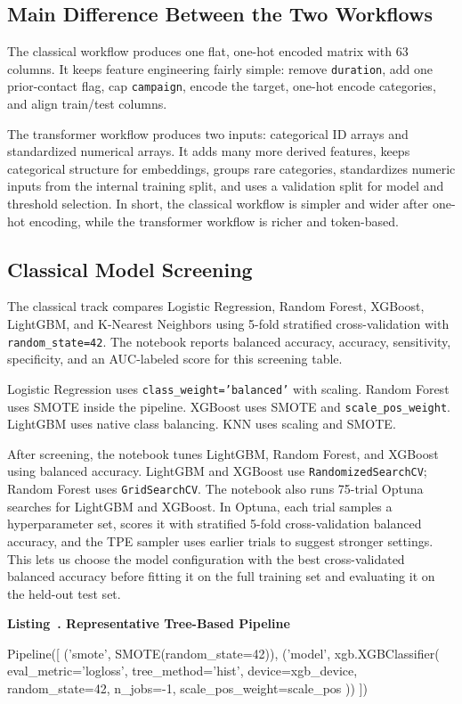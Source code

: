 \documentclass[10pt,twocolumn]{article}
\newcounter{listing}
\renewcommand{\thelisting}{\arabic{listing}}
\newcommand{\listingcaption}[2]{%
  \refstepcounter{listing}%
  \par\smallskip\noindent\textbf{Listing~\thelisting. #1}\label{#2}\par
}
\newcommand{\codestr}[1]{\textcolor{codestring}{\ttfamily #1}}
\begin{document}
\subsection{Main Difference Between the Two Workflows}
The classical workflow produces one flat, one-hot encoded matrix with 63 columns. It keeps feature engineering fairly simple: remove \texttt{duration}, add one prior-contact flag, cap \texttt{campaign}, encode the target, one-hot encode categories, and align train/test columns.

The transformer workflow produces two inputs: categorical ID arrays and standardized numerical arrays. It adds many more derived features, keeps categorical structure for embeddings, groups rare categories, standardizes numeric inputs from the internal training split, and uses a validation split for model and threshold selection. In short, the classical workflow is simpler and wider after one-hot encoding, while the transformer workflow is richer and token-based.

\subsection{Classical Model Screening}
The classical track compares Logistic Regression, Random Forest, XGBoost, LightGBM, and K-Nearest Neighbors using 5-fold stratified cross-validation with \texttt{random\_state=42}. The notebook reports balanced accuracy, accuracy, sensitivity, specificity, and an AUC-labeled score for this screening table.

Logistic Regression uses \texttt{class\_weight='balanced'} with scaling. Random Forest uses SMOTE inside the pipeline. XGBoost uses SMOTE and \texttt{scale\_pos\_weight}. LightGBM uses native class balancing. KNN uses scaling and SMOTE.

After screening, the notebook tunes LightGBM, Random Forest, and XGBoost using balanced accuracy. LightGBM and XGBoost use \texttt{RandomizedSearchCV}; Random Forest uses \texttt{GridSearchCV}. The notebook also runs 75-trial Optuna searches for LightGBM and XGBoost. In Optuna, each trial samples a hyperparameter set, scores it with stratified 5-fold cross-validation balanced accuracy, and the TPE sampler uses earlier trials to suggest stronger settings. This lets us choose the model configuration with the best cross-validated balanced accuracy before fitting it on the full training set and evaluating it on the held-out test set.

\listingcaption{Representative Tree-Based Pipeline}{lst:tree-pipeline}
{\footnotesize
\begin{ReportCode}
Pipeline([
    (\codestr{'smote'}, SMOTE(random_state=42)),
    (\codestr{'model'}, xgb.XGBClassifier(
        eval_metric=\codestr{'logloss'},
        tree_method=\codestr{'hist'},
        device=xgb_device,
        random_state=42,
        n_jobs=-1,
        scale_pos_weight=scale_pos
    ))
])
\end{ReportCode}
}
\end{document}
